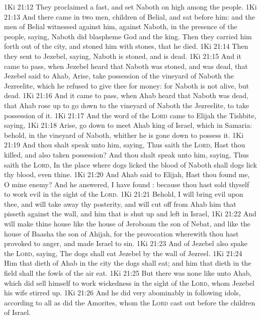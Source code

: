 \vs 1Ki 21:12 They proclaimed a fast, and set Naboth on high among the people.
\vs 1Ki 21:13 And there came in two men, children of Belial, and sat before him: and the men of Belial witnessed against him,  against Naboth, in the presence of the people, saying, Naboth did blaspheme God and the king. Then they carried him forth out of the city, and stoned him with stones, that he died.
\vs 1Ki 21:14 Then they sent to Jezebel, saying, Naboth is stoned, and is dead.
\vs 1Ki 21:15 And it came to pass, when Jezebel heard that Naboth was stoned, and was dead, that Jezebel said to Ahab, Arise, take possession of the vineyard of Naboth the Jezreelite, which he refused to give thee for money: for Naboth is not alive, but dead.
\vs 1Ki 21:16 And it came to pass, when Ahab heard that Naboth was dead, that Ahab rose up to go down to the vineyard of Naboth the Jezreelite, to take possession of it.
\vs 1Ki 21:17 And the word of the \textsc{Lord} came to Elijah the Tishbite, saying,
\vs 1Ki 21:18 Arise, go down to meet Ahab king of Israel, which  in Samaria: behold,  in the vineyard of Naboth, whither he is gone down to possess it.
\vs 1Ki 21:19 And thou shalt speak unto him, saying, Thus saith the \textsc{Lord}, Hast thou killed, and also taken possession? And thou shalt speak unto him, saying, Thus saith the \textsc{Lord}, In the place where dogs licked the blood of Naboth shall dogs lick thy blood, even thine.
\vs 1Ki 21:20 And Ahab said to Elijah, Hast thou found me, O mine enemy? And he answered, I have found : because thou hast sold thyself to work evil in the sight of the \textsc{Lord}.
\vs 1Ki 21:21 Behold, I will bring evil upon thee, and will take away thy posterity, and will cut off from Ahab him that pisseth against the wall, and him that is shut up and left in Israel,
\vs 1Ki 21:22 And will make thine house like the house of Jeroboam the son of Nebat, and like the house of Baasha the son of Ahijah, for the provocation wherewith thou hast provoked  to anger, and made Israel to sin.
\vs 1Ki 21:23 And of Jezebel also spake the \textsc{Lord}, saying, The dogs shall eat Jezebel by the wall of Jezreel.
\vs 1Ki 21:24 Him that dieth of Ahab in the city the dogs shall eat; and him that dieth in the field shall the fowls of the air eat.
\vs 1Ki 21:25 But there was none like unto Ahab, which did sell himself to work wickedness in the sight of the \textsc{Lord}, whom Jezebel his wife stirred up.
\vs 1Ki 21:26 And he did very abominably in following idols, according to all  as did the Amorites, whom the \textsc{Lord} cast out before the children of Israel.

